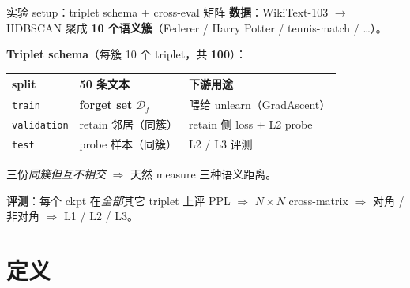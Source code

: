 \documentclass[aspectratio=169,10pt]{beamer}
\begin{document}
\begin{frame}{实验 setup：triplet schema + cross-eval 矩阵}
    \vspace{0.3em}
    \textbf{数据}：WikiText-103 $\to$ HDBSCAN 聚成 \textbf{10 个语义簇}\footnotesize{（Federer / Harry Potter / tennis-match / …）}\small。

    \vspace{0.6em}
    \textbf{Triplet schema}（每簇 10 个 triplet，共 \textbf{100}）：
    \begin{center}
    \small
    \begin{tabular}{@{}lll@{}}
        \toprule
        split & 50 条文本 & 下游用途 \\
        \midrule
        \texttt{train}      & \textbf{forget set} $\mathcal{D}_f$   & 喂给 unlearn（GradAscent） \\
        \texttt{validation} & retain 邻居（同簇）     & retain 侧 loss + L2 probe \\
        \texttt{test}       & probe 样本（同簇）      & L2 / L3 评测 \\
        \bottomrule
    \end{tabular}
    \end{center}
    三份\emph{同簇但互不相交} $\Rightarrow$ 天然 measure 三种语义距离。

    \vspace{0.6em}
    \textbf{评测}：每个 ckpt 在\emph{全部}其它 triplet 上评 PPL $\Rightarrow$ $N \!\times\! N$ cross-matrix
    $\Rightarrow$ 对角 / 非对角 $\Rightarrow$ L1 / L2 / L3。
\end{frame}

\section{定义}
\end{document}
